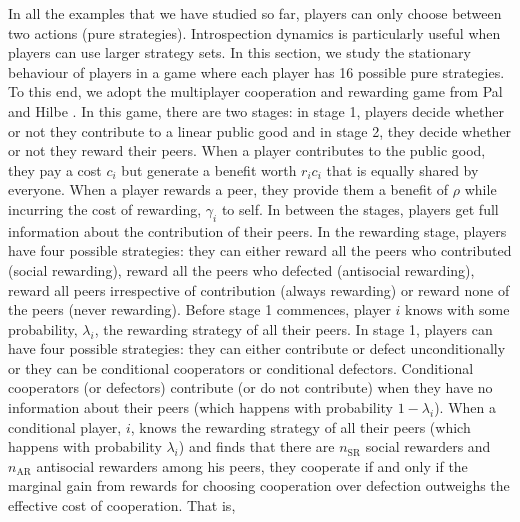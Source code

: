 \documentclass[11pt]{article}
\theoremstyle{plainCl1}
\theoremstyle{plainCl2}
\begin{document}
In all the examples that we have studied so far, players can only choose between two actions (pure strategies). Introspection dynamics is particularly useful when players can use larger strategy sets. In this section, we study the stationary behaviour of players in a game where each player has 16 possible pure strategies. To this end, we adopt the multiplayer cooperation and rewarding game from Pal and Hilbe \cite{Pal:NatCom:2022}. In this game, there are two stages: in stage 1, players decide whether or not they contribute to a linear public good and in stage 2, they decide whether or not they reward their peers. When a player contributes to the public good, they pay a cost $c_i$ but generate a benefit worth $r_i c_i$ that is equally shared by everyone. When a player rewards a peer, they provide them a benefit of $\rho$ while incurring the cost of rewarding, $\gamma_i$ to self. In between the stages, players get full information about the contribution of their peers. In the rewarding stage, players have four possible strategies: they can either reward all the peers who contributed (social rewarding), reward all the peers who defected (antisocial rewarding), reward all peers irrespective of contribution (always rewarding) or reward none of the peers (never rewarding). Before stage 1 commences, player $i$ knows with some probability, $\lambda_i$, the rewarding strategy of all their peers. In stage 1, players can have four possible strategies: they can either contribute or defect unconditionally or they can be conditional cooperators or conditional defectors. Conditional cooperators (or defectors) contribute (or do not contribute) when they have no information about their peers (which happens with probability $1 - \lambda_i$). When a conditional player, $i$, knows the rewarding strategy of all their peers (which happens with probability $\lambda_i$) and finds that there are $n_{\mathrm{SR}}$ social rewarders and $n_{\mathrm{AR}}$ antisocial rewarders among his peers, they cooperate if and only if the marginal gain from rewards for choosing cooperation over defection outweighs the effective cost of cooperation. That is, 
\end{document}

